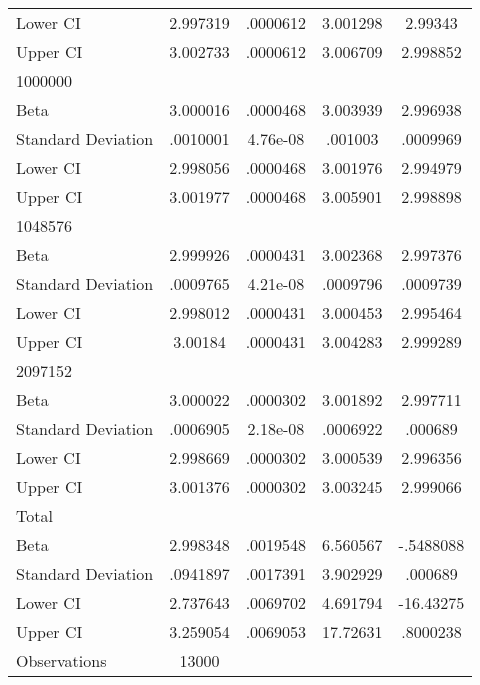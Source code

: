 {\begin{tabular}{l*{1}{cccc}}
Lower CI            &    2.997319&    .0000612&    3.001298&     2.99343\\
Upper CI            &    3.002733&    .0000612&    3.006709&    2.998852\\
\hline
1000000             &            &            &            &            \\
Beta                &    3.000016&    .0000468&    3.003939&    2.996938\\
Standard Deviation  &    .0010001&    4.76e-08&     .001003&    .0009969\\
Lower CI            &    2.998056&    .0000468&    3.001976&    2.994979\\
Upper CI            &    3.001977&    .0000468&    3.005901&    2.998898\\
\hline
1048576             &            &            &            &            \\
Beta                &    2.999926&    .0000431&    3.002368&    2.997376\\
Standard Deviation  &    .0009765&    4.21e-08&    .0009796&    .0009739\\
Lower CI            &    2.998012&    .0000431&    3.000453&    2.995464\\
Upper CI            &     3.00184&    .0000431&    3.004283&    2.999289\\
\hline
2097152             &            &            &            &            \\
Beta                &    3.000022&    .0000302&    3.001892&    2.997711\\
Standard Deviation  &    .0006905&    2.18e-08&    .0006922&     .000689\\
Lower CI            &    2.998669&    .0000302&    3.000539&    2.996356\\
Upper CI            &    3.001376&    .0000302&    3.003245&    2.999066\\
\hline
Total               &            &            &            &            \\
Beta                &    2.998348&    .0019548&    6.560567&   -.5488088\\
Standard Deviation  &    .0941897&    .0017391&    3.902929&     .000689\\
Lower CI            &    2.737643&    .0069702&    4.691794&   -16.43275\\
Upper CI            &    3.259054&    .0069053&    17.72631&    .8000238\\
\hline
Observations        &       13000&            &            &            \\
\hline\hline
\end{tabular}
}
